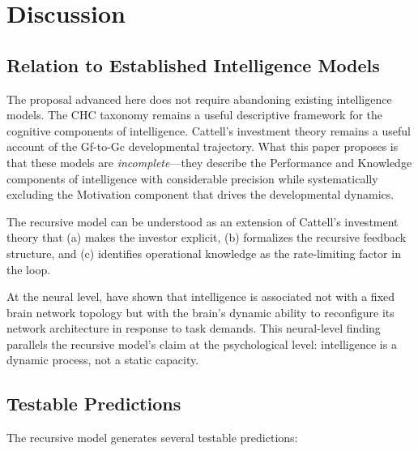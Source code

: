 \documentclass[12pt,a4paper]{article}
\begin{document}
\section{Discussion}

\subsection{Relation to Established Intelligence Models}

The proposal advanced here does not require abandoning existing intelligence models. The CHC taxonomy remains a useful descriptive framework for the cognitive components of intelligence. Cattell's investment theory remains a useful account of the Gf-to-Gc developmental trajectory. What this paper proposes is that these models are \emph{incomplete}---\hspace{0pt}they describe the Performance and Knowledge components of intelligence with considerable precision while systematically excluding the Motivation component that drives the developmental dynamics.

The recursive model can be understood as an extension of Cattell's investment theory that (a) makes the investor explicit, (b) formalizes the recursive feedback structure, and (c) identifies operational knowledge as the rate-limiting factor in the loop.

At the neural level, \citet{Hilger2020} have shown that intelligence is associated not with a fixed brain network topology but with the brain's dynamic ability to reconfigure its network architecture in response to task demands. This neural-level finding parallels the recursive model's claim at the psychological level: intelligence is a dynamic process, not a static capacity.

\subsection{Testable Predictions}

The recursive model generates several testable predictions:
\end{document}
